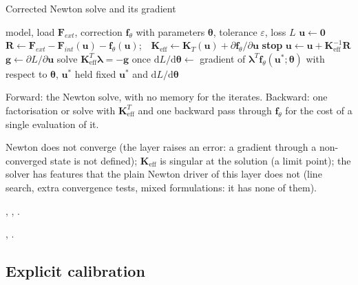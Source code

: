 \begin{algbox}{Corrected Newton solve and its gradient}
\begin{pseudo}
\Require model, load $\bm F_{ext}$, correction $\bm f_\theta$ with parameters $\bm\theta$, tolerance $\varepsilon$, loss $L$
\State $\bm u\gets\bm 0$
\Repeat {}
  \State $\bm R\gets\bm F_{ext}-\bm F_{int}(\bm u)-\bm f_\theta(\bm u)$;\ \ $\bm K_{\mathrm{eff}}\gets\bm K_T(\bm u)+\partial\bm f_\theta/\partial\bm u$
   \textbf{stop} \EndIf
  \State $\bm u\gets\bm u+\bm K_{\mathrm{eff}}^{-1}\bm R$
\State $\bm g\gets\partial L/\partial\bm u$ 
\State solve $\bm K_{\mathrm{eff}}^T\bm\lambda=-\bm g$ once
\State $\mathrm dL/\mathrm d\bm\theta\gets$ gradient of $\bm\lambda^T\bm f_\theta(\bm u^\ast;\bm\theta)$ with respect to $\bm\theta$, $\bm u^\ast$ held fixed
\Ensure $\bm u^\ast$ and $\mathrm dL/\mathrm d\bm\theta$
\end{pseudo}
\begin{algdet}
\item[Cost] Forward: the Newton solve, with no memory for the iterates. Backward: one factorisation or solve with $\bm K_{\mathrm{eff}}^T$ and one backward pass through $\bm f_\theta$ for the cost of a single evaluation of it.
\item[Fails when] Newton does not converge (the layer raises an error: a gradient through a non-converged state is not defined); $\bm K_{\mathrm{eff}}$ is singular at the solution (a limit point); the solver has features that the plain Newton driver of this layer does not (line search, extra convergence tests, mixed formulations: it has none of them).
\item[Code] , , .
\item[Verified in] , .
\end{algdet}
\end{algbox}

\subsection{Explicit calibration}\label{sec:df-explicit}


